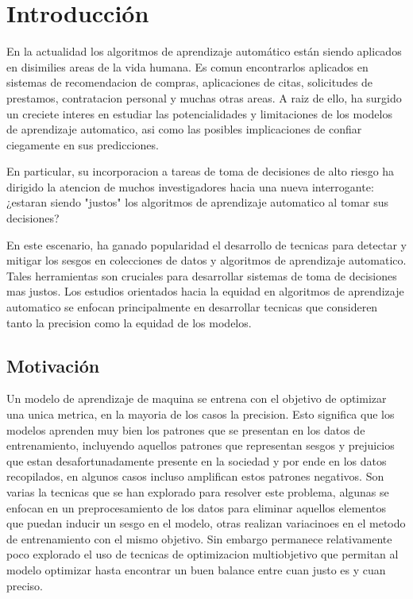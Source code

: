 \chapter*{Introducción}\label{chapter:introduction}

En la actualidad los algoritmos de aprendizaje automático están siendo aplicados en disimilies areas de la vida humana. Es comun encontrarlos aplicados en sistemas de recomendacion de compras, aplicaciones de citas, solicitudes de prestamos, contratacion personal y muchas otras areas.  A raiz de ello, ha surgido un creciete interes en estudiar las potencialidades y limitaciones de los modelos de aprendizaje automatico, asi como las posibles implicaciones de confiar ciegamente en sus predicciones.

En particular, su incorporacion a tareas de toma de decisiones de alto riesgo ha dirigido la atencion de muchos investigadores hacia una nueva interrogante: ¿estaran siendo "justos" los algoritmos de aprendizaje automatico al tomar sus decisiones?

En este escenario, ha ganado popularidad el desarrollo de tecnicas para detectar y mitigar los sesgos en colecciones de datos y algoritmos de aprendizaje automatico. Tales herramientas son cruciales para desarrollar sistemas de toma de decisiones mas justos. Los estudios orientados hacia la equidad en algoritmos de aprendizaje automatico se enfocan principalmente en desarrollar tecnicas que consideren tanto la precision como la equidad de los modelos.

\section*{Motivación}

Un modelo de aprendizaje de maquina se entrena con el objetivo de optimizar una unica metrica, en la mayoria de los casos la precision. Esto significa que los modelos aprenden muy bien los patrones que se presentan en los datos de entrenamiento, incluyendo aquellos patrones que representan sesgos y prejuicios que estan desafortunadamente presente en la sociedad y por ende en los datos recopilados, en algunos casos incluso amplifican estos patrones negativos. Son varias la tecnicas que se han explorado para resolver este problema, algunas se enfocan en un preprocesamiento de los datos para eliminar aquellos elementos que puedan inducir un sesgo en el modelo, otras realizan variacinoes en el metodo de entrenamiento con el mismo objetivo. Sin embargo permanece relativamente poco explorado el uso de tecnicas de optimizacion multiobjetivo que permitan al modelo optimizar hasta encontrar un buen balance entre cuan justo es y cuan preciso.

